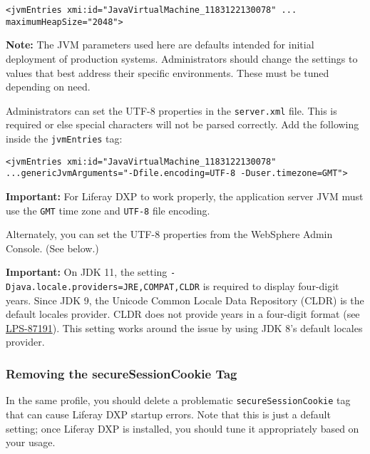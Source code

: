 \begin{verbatim}
<jvmEntries xmi:id="JavaVirtualMachine_1183122130078" ... maximumHeapSize="2048">
\end{verbatim}

\noindent\hrulefill

\textbf{Note:} The JVM parameters used here are defaults intended for
initial deployment of production systems. Administrators should change
the settings to values that best address their specific environments.
These must be tuned depending on need.

\noindent\hrulefill

Administrators can set the UTF-8 properties in the \texttt{server.xml}
file. This is required or else special characters will not be parsed
correctly. Add the following inside the \texttt{jvmEntries} tag:

\begin{verbatim}
<jvmEntries xmi:id="JavaVirtualMachine_1183122130078" ...genericJvmArguments="-Dfile.encoding=UTF-8 -Duser.timezone=GMT">
\end{verbatim}

\noindent\hrulefill

\textbf{Important:} For Liferay DXP to work properly, the application
server JVM must use the \texttt{GMT} time zone and \texttt{UTF-8} file
encoding.

\noindent\hrulefill

Alternately, you can set the UTF-8 properties from the WebSphere Admin
Console. (See below.)

\noindent\hrulefill

\textbf{Important:} On JDK 11, the setting
\texttt{-Djava.locale.providers=JRE,COMPAT,CLDR} is required to display
four-digit years. Since JDK 9, the Unicode Common Locale Data Repository
(CLDR) is the default locales provider. CLDR does not provide years in a
four-digit format (see
\href{https://issues.liferay.com/browse/LPS-87191}{LPS-87191}). This
setting works around the issue by using JDK 8's default locales
provider.

\noindent\hrulefill

\subsubsection{Removing the secureSessionCookie
Tag}\label{removing-the-securesessioncookie-tag}

In the same profile, you should delete a problematic
\texttt{secureSessionCookie} tag that can cause Liferay DXP startup
errors. Note that this is just a default setting; once Liferay DXP is
installed, you should tune it appropriately based on your usage.

